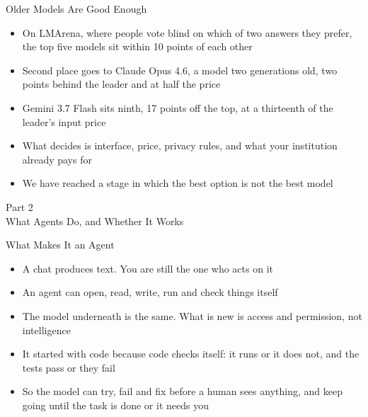 \documentclass[aspectratio=169]{beamer}
\begin{document}
\begin{frame}{Older Models Are Good Enough}
    \begin{itemize}\setlength{\itemsep}{7pt}
        \item On LMArena, where people vote blind on which of two answers they prefer, the
              top five models sit within 10 points of each other
        \item Second place goes to Claude Opus 4.6, a model two generations old, two points
              behind the leader and at half the price
        \item Gemini 3.7 Flash sits ninth, 17 points off the top, at a thirteenth of the
              leader's input price
        \item What decides is interface, price, privacy rules, and what your institution
              already pays for
        \item We have reached a stage in which the best option is not the best model
    \end{itemize}
\end{frame}


\begin{frame}[plain]
    \vfill
    \begin{center}
        {\Huge Part 2}\\[0.8em]
        {\Large What Agents Do, and Whether It Works}
    \end{center}
    \vfill
\end{frame}

\begin{frame}{What Makes It an Agent}
    \begin{itemize}\setlength{\itemsep}{7pt}
        \item A chat produces text. You are still the one who acts on it
        \item An agent can open, read, write, run and check things itself
        \item The model underneath is the same. What is new is access and permission,
              not intelligence
        \item It started with code because code checks itself: it runs or it does not,
              and the tests pass or they fail
        \item So the model can try, fail and fix before a human sees anything, and keep
              going until the task is done or it needs you
    \end{itemize}
\end{frame}
\end{document}
